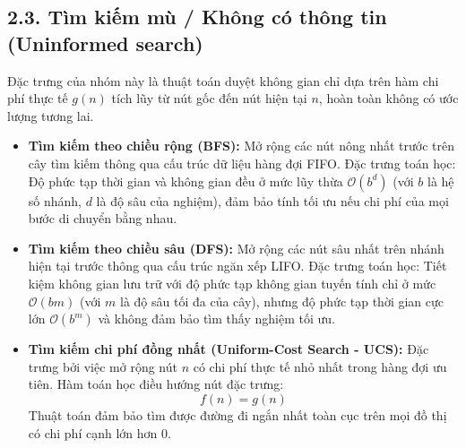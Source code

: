 \documentclass[11pt,a4paper]{article}
\begin{document}
\subsection{2.3. Tìm kiếm mù / Không có thông tin (Uninformed search)}
Đặc trưng của nhóm này là thuật toán duyệt không gian chỉ dựa trên hàm chi phí thực tế $g(n)$ tích lũy từ nút gốc đến nút hiện tại $n$, hoàn toàn không có ước lượng tương lai.
\begin{itemize}
    \item \textbf{Tìm kiếm theo chiều rộng (BFS):} Mở rộng các nút nông nhất trước trên cây tìm kiếm thông qua cấu trúc dữ liệu hàng đợi FIFO. Đặc trưng toán học: Độ phức tạp thời gian và không gian đều ở mức lũy thừa $\mathcal{O}(b^d)$ (với $b$ là hệ số nhánh, $d$ là độ sâu của nghiệm), đảm bảo tính tối ưu nếu chi phí của mọi bước di chuyển bằng nhau.
    \item \textbf{Tìm kiếm theo chiều sâu (DFS):} Mở rộng các nút sâu nhất trên nhánh hiện tại trước thông qua cấu trúc ngăn xếp LIFO. Đặc trưng toán học: Tiết kiệm không gian lưu trữ với độ phức tạp không gian tuyến tính chỉ ở mức $\mathcal{O}(bm)$ (với $m$ là độ sâu tối đa của cây), nhưng độ phức tạp thời gian cực lớn $\mathcal{O}(b^m)$ và không đảm bảo tìm thấy nghiệm tối ưu.
    \item \textbf{Tìm kiếm chi phí đồng nhất (Uniform-Cost Search - UCS):} Đặc trưng bởi việc mở rộng nút $n$ có chi phí thực tế nhỏ nhất trong hàng đợi ưu tiên. Hàm toán học điều hướng nút đặc trưng:
    \begin{equation}
        f(n) = g(n)
    \end{equation}
    Thuật toán đảm bảo tìm được đường đi ngắn nhất toàn cục trên mọi đồ thị có chi phí cạnh lớn hơn 0.
\end{itemize}
\end{document}
